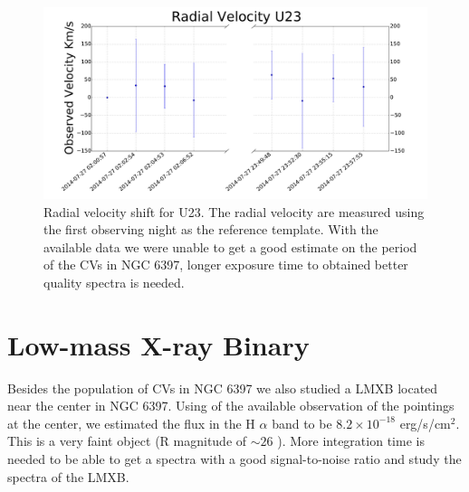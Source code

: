 \begin{figure}
        \centering
        \includegraphics[scale=.3]{assets/images/radU23.pdf}
\caption{Radial velocity shift for U23. The radial velocity are measured using the first observing night as the reference template. With the available data we were unable to get a good estimate on the period of the CVs in NGC 6397, longer exposure time to obtained better quality spectra is needed.}
\label{fig:radU23}
\end{figure}


\section{Low-mass X-ray Binary}
Besides the population of CVs in NGC 6397 we also studied a LMXB located near the center in NGC 6397. Using of the available observation of the pointings at the center, we estimated the flux in the H $\alpha$ band to be $8.2 \times 10^{-18}$ erg/s/cm$^2$. This is a very faint object (R magnitude of $\sim 26$ \citep{heinke_improved_2014}). More integration time is needed to be able to get a spectra with a good signal-to-noise ratio and study the spectra of the LMXB. 


